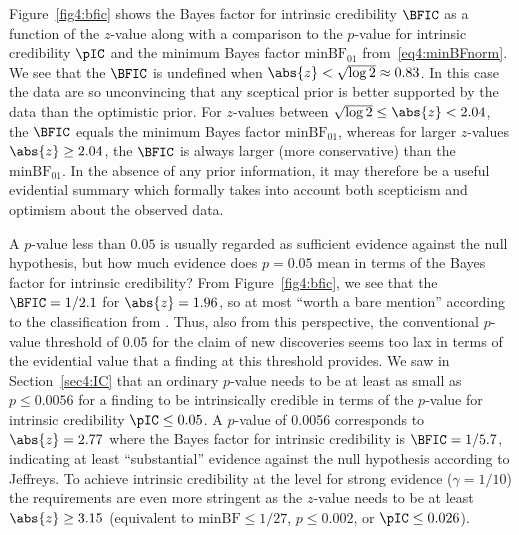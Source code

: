 Figure~\ref{fig4:bfic} shows the Bayes factor for intrinsic credibility $\BFIC$
as a function of the $z$-value along with a comparison to the $p$-value for
intrinsic credibility $\pIC$ and the minimum Bayes factor $\mbox{minBF}_{01}$
from~\eqref{eq4:minBFnorm}. We see that the $\BFIC$ is undefined when
$\abs{z} < \sqrt{\log 2} \approx 0.83$. In this case the data are so
unconvincing that any sceptical prior is better supported by the data than the
optimistic prior. For $z$-values between $\sqrt{\log 2} \leq \abs{z} < 2.04$,
the $\BFIC$ equals the minimum Bayes factor $\mbox{minBF}_{01}$, whereas for
larger $z$-values $\abs{z} \geq 2.04$, the $\BFIC$ is always larger (more
conservative) than the $\mbox{minBF}_{01}$. In the absence of any prior
information, it may therefore be a useful evidential summary which formally
takes into account both scepticism and optimism about the observed data.


A $p$-value less than $0.05$ is usually regarded as sufficient evidence against
the null hypothesis, but how much evidence does $p = 0.05$ mean in terms of the
Bayes factor for intrinsic credibility? From Figure~\ref{fig4:bfic}, we see that
the $\BFIC = 1/2.1$ for $\abs{z} = 1.96$, so at most ``worth a bare mention''
according to the classification from \citet{Jeffreys1961}. Thus, also from this
perspective, the conventional $p$-value threshold of 0.05 for the claim of new
discoveries seems too lax in terms of the evidential value that a finding at
this threshold provides. We saw in Section~\ref{sec4:IC} that an ordinary
$p$-value needs to be at least as small as $p \leq 0.0056$ for a finding to be
intrinsically credible in terms of the $p$-value for intrinsic credibility
$\pIC \leq 0.05$. A $p$-value of 0.0056 corresponds to $\abs{z} = 2.77$ where
the Bayes factor for intrinsic credibility is $\BFIC = 1/5.7$, indicating at
least ``substantial'' evidence against the null hypothesis according to
Jeffreys. To achieve intrinsic credibility at the level for strong evidence
($\gamma = 1/10$) the requirements are even more stringent as the $z$-value
needs to be at least $\abs{z} \geq 3.15$ (equivalent to
$\mbox{minBF} \leq 1/27$, $p \leq 0.002$, or $\pIC \leq 0.026$).

